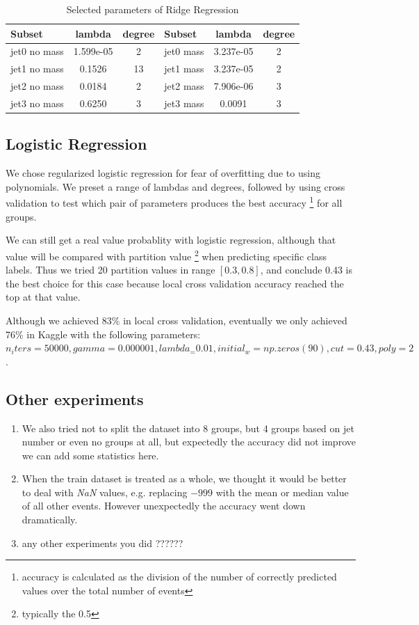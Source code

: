 \documentclass[10pt,conference,compsocconf]{IEEEtran}
\begin{document}
\begin{table}[htbp]
  \centering
  \begin{tabular}[c]{| l | c | c || l | c | c |}
    \hline
    Subset 	     & lambda & degree & Subset     & lambda      & degree \\
    \hline
    \hline 
    jet0 no mass & 1.599e-05	& 2	 & jet0 mass  & 3.237e-05  & 2	\\
    jet1 no mass & 0.1526		  & 13 & jet1 mass  & 3.237e-05  & 2 	\\
    jet2 no mass & 0.0184		  & 2	 & jet2 mass  & 7.906e-06  & 3 	\\
    jet3 no mass & 0.6250		  & 3	 & jet3 mass  & 0.0091     & 3  \\
    \hline
  \end{tabular}
  \caption{Selected parameters of Ridge Regression}
  \label{tab:param}
\end{table}


\subsection{Logistic Regression}
We chose regularized logistic regression for fear of overfitting due to using polynomials. We preset a range of lambdas and degrees, followed by using cross validation to test which pair of parameters produces the best accuracy \footnote{accuracy is calculated as the division of the number of correctly predicted values over the total number of events} for all groups. 

We can still get a real value probablity with logistic regression, although that value will be compared with partition value \footnote{typically the 0.5} when predicting specific class labels. Thus we tried 20 partition values in range $[0.3, 0.8]$, and conclude 0.43 is the best choice for this case because local cross validation accuracy reached the top at that value.

Although we achieved 83\% in local cross validation, eventually we only achieved 76\% in Kaggle with the following parameters: $n_iters = 50000, gamma = 0.000001, lambda_ = 0.01, initial_w = np.zeros(90), cut = 0.43, poly = 2$.


\subsection{Other experiments}
\begin{enumerate}
\item We also tried not to split the dataset into 8 groups, but 4 groups based on jet number or even no groups at all, but expectedly the accuracy did not improve {\color{red} we can add some statistics here}. 
\item When the train dataset is treated as a whole, we thought it would be better to deal with \textit{NaN} values, e.g. replacing $-999$ with the mean or median value of all other events. However unexpectedly the accuracy went down dramatically. 
\item {\color{red}any other experiments you did ??????}
\end{enumerate}
\end{document}
